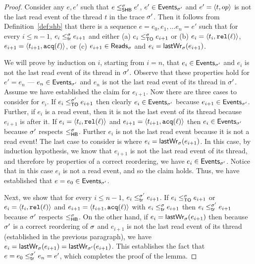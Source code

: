 \begin{proof}
Consider any $e,e'$ such that $e \leq^{\sigma}_{\mathsf{SHB}} e'$, $e' \in \mathsf{Events}_{\sigma'}$
and $e' = \langle t, op\rangle$ is not the last read event of the thread $t$ in
the trace $\sigma'$.  Then it follows from Definition~\ref{def:shb} that
there is a sequence $e = e_0, e_1, \ldots e_n = e'$ such that for
every $i \leq n-1$, $e_i \leq^{\sigma}_{\mathsf{tr}} e_{i+1}$ and either (a)
$e_i \leq^{\sigma}_{\mathsf{TO}} e_{i+1}$ or (b) $e_i = \langle t_i,\mathtt{rel}(\ell)\rangle$, $e_{i+1}
= \langle t_{i+1},\mathtt{acq}(\ell)\rangle$, or (c) $e_{i+1} \in \mathsf{Reads}_{\sigma}$ and $e_i
= \mathsf{lastWr}_{\sigma}(e_{i+1})$.

We will prove by induction on $i$, starting from $i = n$, that
$e_i \in \mathsf{Events}_{\sigma'}$ and $e_i$ is not the last read event of its
thread in $\sigma'$. Observe that these properties hold for $e' = e_n$
--- $e_n \in \mathsf{Events}_{\sigma'}$ and $e_n$ is not the last read event of
its thread in $\sigma'$. Assume we have established the claim for
$e_{i+1}$. Now there are three cases to consider for $e_i$. If
$e_i \leq^{\sigma'}_{\mathsf{TO}} e_{i+1}$ then clearly $e_i \in \mathsf{Events}_{\sigma'}$ because
$e_{i+1} \in \mathsf{Events}_{\sigma'}$. Further, if $e_i$ is a read event, then
it is not the last event of its thread because $e_{i+1}$ is after
it. If $e_i = \langle t_i,\mathtt{rel}(\ell)\rangle$ and $e_{i+1}
= \langle t_{i+1},\mathtt{acq}(\ell)\rangle$ then $e_i \in \mathsf{Events}_{\sigma'}$ because $\sigma'$
respects $\leq^{\sigma}_{\mathsf{HB}}$. Further $e_i$ is not the last read event because
it is not a read event! The last case to consider is where $e_i
= \mathsf{lastWr}_{\sigma}(e_{i+1})$. In this case, by induction hypothesis, we know
that $e_{i+1}$ is not the last read event of its thread, and therefore
by properties of a correct reordering, we have
$e_i \in \mathsf{Events}_{\sigma'}$. Notice that in this case $e_i$ is not a read
event, and so the claim holds. Thus, we have established that $e =
e_0 \in \mathsf{Events}_{\sigma'}$.

Next, we show that for every $i \leq n-1$, $e_i \leq^{\sigma'}_{\mathsf{tr}}
e_{i+1}$. If $e_i \leq^{\sigma}_{\mathsf{TO}} e_{i+1}$ or $e_i = \langle t_i,\mathtt{rel}(\ell)\rangle$ and
$e_{i+1} = \langle t_{i+1},\mathtt{acq}(\ell)\rangle$ with $e_i \leq^{\sigma}_{\mathsf{tr}} e_{i+1}$ then
$e_i \leq^{\sigma'}_{\mathsf{tr}} e_{i+1}$ because $\sigma'$ respects $\leq^{\sigma}_{\mathsf{HB}}$. On the
other hand, if $e_i = \mathsf{lastWr}_{\sigma}(e_{i+1})$ then because $\sigma'$ is a
correct reordering of $\sigma$ and $e_{i+1}$ is not the last read event
of its thread (established in the previous paragraph), we have $e_i
= \mathsf{lastWr}_{\sigma}(e_{i+1}) = \mathsf{lastWr}_{\sigma'}(e_{i+1})$.  This establishes the fact
that $e = e_0 \leq^{\sigma'}_{\mathsf{tr}} e_n = e'$, which completes the proof of the
lemma.
\end{proof}

